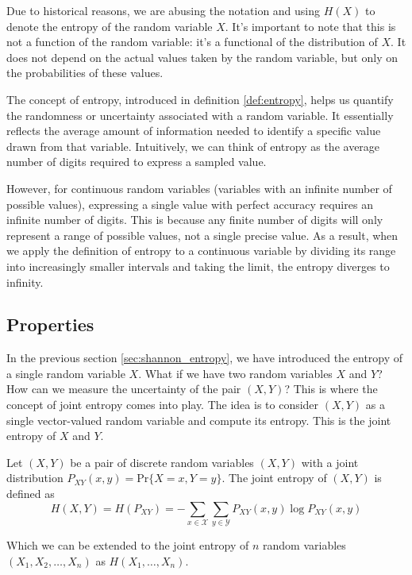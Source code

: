 \begin{remark}
    Due to historical reasons, we are abusing the notation and using $H(X)$ to denote the entropy of the random variable $X$. It's important to note that this is not a function of the random variable: it's a functional of the distribution of $X$. It does not depend on the actual values taken by the random variable, but only on the probabilities of these values.
\end{remark}
The concept of entropy, introduced in definition \ref{def:entropy}, helps us quantify the randomness or uncertainty associated with a random variable. It essentially reflects the average amount of information needed to identify a specific value drawn from that variable. Intuitively, we can think of entropy as the average number of digits required to express a sampled value.

However, for continuous random variables (variables with an infinite number of possible values), expressing a single value with perfect accuracy requires an infinite number of digits. This is because any finite number of digits will only represent a range of possible values, not a single precise value. As a result, when we apply the definition of entropy to a continuous variable by dividing its range into increasingly smaller intervals and taking the limit, the entropy diverges to infinity.


\subsection{Properties}
In the previous section \ref{sec:shannon_entropy}, we have introduced the entropy of a single random variable $X$. What if we have two random variables $X$ and $Y$? How can we measure the uncertainty of the pair $(X,Y)$? This is where the concept of joint entropy comes into play. The idea is to consider $(X,Y)$ as a single vector-valued random variable and compute its entropy. This is the joint entropy of $X$ and $Y$.

\begin{definition}\label{def:joint_entropy}
    Let $(X,Y)$ be a pair of discrete random variables $(X,Y)$ with a joint distribution $P_{XY}(x,y) = \text{Pr}\{X=x,Y=y\}$. The joint entropy of $(X,Y)$ is defined as
    \begin{equation}\label{eq:joint_entropy}
        H(X,Y) = H(P_{XY}) = -\sum_{x\in\mathcal{X}}\sum_{y\in\mathcal{Y}} P_{XY}(x,y)\log P_{XY}(x,y)
    \end{equation}
\end{definition}
Which we can be extended to the joint entropy of $n$ random variables $(X_1,X_2,\ldots,X_n)$ as $H(X_1,\ldots, X_n)$. \vspace*{0.4cm}

